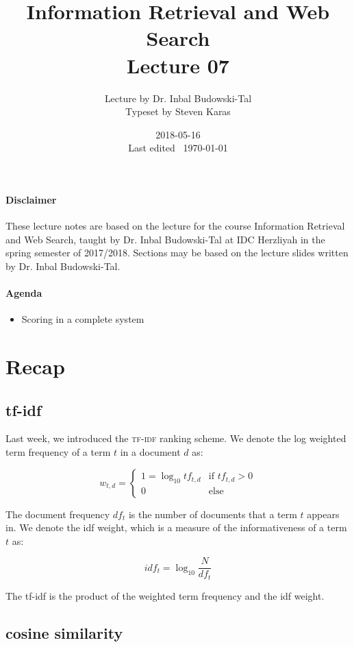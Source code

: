\documentclass{idc_msc}
\title{Information Retrieval and Web Search\\\large Lecture 07}
\date{2018-05-16 \\ Last edited \currenttime\ \today}
\author{Lecture by Dr. Inbal Budowski-Tal\\Typeset by Steven Karas}
\begin{document}
\maketitle

\paragraph{Disclaimer}

These lecture notes are based on the lecture for the course Information Retrieval and Web Search, taught by Dr. Inbal Budowski-Tal at IDC Herzliyah in the spring semester of 2017/2018.
Sections may be based on the lecture slides written by Dr. Inbal Budowski-Tal.

\paragraph{Agenda}

\begin{itemize}
  \item Scoring in a complete system
\end{itemize}

\nocite{manning2008introduction}

\section{Recap}

\subsection{tf-idf}

Last week, we introduced the \textsc{tf-idf} ranking scheme.
We denote the log weighted term frequency of a term \(t\) in a document \(d\) as:

\[w_{t,d} = \begin{cases}1 = \log_{10} tf_{t,d} & \text{if }tf_{t,d} > 0 \\ 0 & \text{else}\end{cases}\]

The document frequency \(df_t\) is the number of documents that a term \(t\) appears in.
We denote the idf weight, which is a measure of the informativeness of a term \(t\) as:

\[idf_t = \log_{10}\frac{N}{df_t}\]

The tf-idf is the product of the weighted term frequency and the idf weight.

\subsection{cosine similarity}
\end{document}
